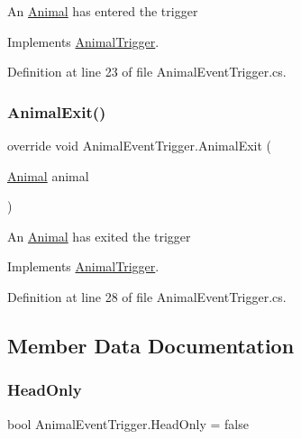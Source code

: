 An \mbox{\hyperlink{class_animal}{Animal}} has entered the trigger 



Implements \mbox{\hyperlink{class_animal_trigger_a03181803fa268e0bfcbdc752ee733c40}{Animal\+Trigger}}.



Definition at line 23 of file Animal\+Event\+Trigger.\+cs.

\mbox{\label{class_animal_event_trigger_a5fb92b33d31fee51fbf2237fd3aead55}} 
\subsubsection{\texorpdfstring{Animal\+Exit()}{AnimalExit()}}
{\footnotesize\ttfamily override void Animal\+Event\+Trigger.\+Animal\+Exit (\begin{DoxyParamCaption}\item[{\mbox{\hyperlink{class_animal}{Animal}}}]{animal }\end{DoxyParamCaption})\hspace{0.3cm}{\ttfamily [virtual]}}



An \mbox{\hyperlink{class_animal}{Animal}} has exited the trigger 



Implements \mbox{\hyperlink{class_animal_trigger_aa1a7c2e90de76c2e089b2bae01813f5c}{Animal\+Trigger}}.



Definition at line 28 of file Animal\+Event\+Trigger.\+cs.



\subsection{Member Data Documentation}
\mbox{\label{class_animal_event_trigger_ad6c824d5bd40087af8d5310e2f6596ae}} 
\subsubsection{\texorpdfstring{Head\+Only}{HeadOnly}}
{\footnotesize\ttfamily bool Animal\+Event\+Trigger.\+Head\+Only = false}



